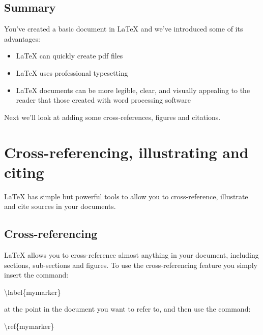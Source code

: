 \documentclass[
]{book}
\newenvironment{Shaded}{\begin{snugshade}}{\end{snugshade}}
\newcommand{\NormalTok}[1]{#1}
\providecommand{\tightlist}{%
  \setlength{\itemsep}{0pt}\setlength{\parskip}{0pt}}
\begin{document}
\hypertarget{concsimple}{%
\section{Summary}\label{concsimple}}

You've created a basic document in LaTeX and we've introduced some of its advantages:

\begin{itemize}
\tightlist
\item
  LaTeX can quickly create pdf files
\item
  LaTeX uses professional typesetting
\item
  LaTeX documents can be more legible, clear, and visually appealing to the reader that those created with word processing software
\end{itemize}

Next we'll look at adding some cross-references, figures and citations.

\hypertarget{figref}{%
\chapter{Cross-referencing, illustrating and citing}\label{figref}}

LaTeX has simple but powerful tools to allow you to cross-reference, illustrate and cite sources in your documents.

\hypertarget{cross-referencing}{%
\section{Cross-referencing}\label{cross-referencing}}

LaTeX allows you to cross-reference almost anything in your document, including sections, sub-sections and figures. To use the cross-referencing feature you simply insert the command:

\begin{Shaded}
\begin{Highlighting}[]
\NormalTok{\textbackslash{}label\{mymarker\}}
\end{Highlighting}
\end{Shaded}

at the point in the document you want to refer to, and then use the command:

\begin{Shaded}
\begin{Highlighting}[]
\NormalTok{\textbackslash{}ref\{mymarker\}}
\end{Highlighting}
\end{Shaded}
\end{document}
